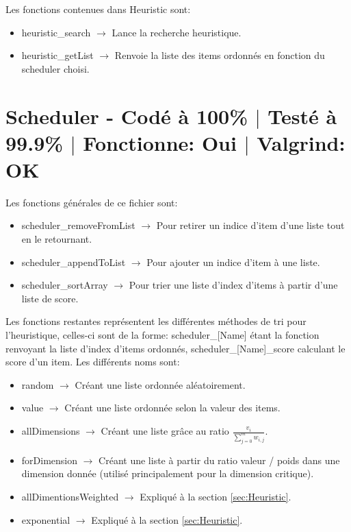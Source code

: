 \documentclass{EPUProjetPeiP}
\newcommand{\comp}[5]{
	\section[#1]{#1 {\small - Codé à #2\% $\vert$ Testé à #3\% $\vert$ Fonctionne: #4 $\vert$ Valgrind: #5}}
}
\begin{document}
Les fonctions contenues dans Heuristic sont:
\begin{itemize}
	\item heuristic\_search $\longrightarrow$ Lance la recherche heuristique.
	\item heuristic\_getList $\longrightarrow$ Renvoie la liste des items ordonnés en fonction du scheduler choisi.
\end{itemize}

\comp{Scheduler \label{sec:Scheduler}}{100}{99.9}{Oui}{OK}
Les fonctions générales de ce fichier sont:
\begin{itemize}
	\item scheduler\_removeFromList $\longrightarrow$ Pour retirer un indice d'item d'une liste tout en le retournant.
	\item scheduler\_appendToList $\longrightarrow$ Pour ajouter un indice d'item à une liste.
	\item scheduler\_sortArray $\longrightarrow$ Pour trier une liste d'index d'items à partir d'une liste de score.\\
\end{itemize}

Les fonctions restantes représentent les différentes méthodes de tri pour l'heuristique, celles-ci sont de la forme: scheduler\_[Name] étant la fonction renvoyant la liste d'index d'items ordonnés, scheduler\_[Name]\_score calculant le score d'un item.
Les différents noms sont:
\begin{itemize}
	\item random $\longrightarrow$ Créant une liste ordonnée aléatoirement.
	\item value $\longrightarrow$ Créant une liste ordonnée selon la valeur des items.
	\item allDimensions $\longrightarrow$ Créant une liste grâce au ratio $\frac{v_i}{\sum_{j=0}^mw_{i,j}}$.
	\item forDimension $\longrightarrow$ Créant une liste à partir du ratio valeur / poids dans une dimension donnée (utilisé principalement pour la dimension critique).
	\item allDimentionsWeighted  $\longrightarrow$ Expliqué à la section \ref{sec:Heuristic}.
	\item exponential  $\longrightarrow$ Expliqué à la section \ref{sec:Heuristic}.
\end{itemize}
\end{document}
